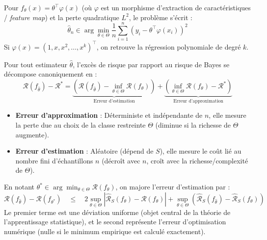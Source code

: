 \begin{example}
    Pour $f_\theta(x) = \theta^\top \varphi(x)$ (où $\varphi$ est un morphisme d'extraction de caractéristiques / \emph{feature map}) et la perte quadratique $L^2$, le problème s'écrit :
    \begin{equation}
        \hat{\theta}_n \in \arg \min_{\theta \in \Theta} \frac{1}{n} \sum_{i=1}^n (y_i - \theta^\top \varphi(x_i))^2
    \end{equation}
    Si $\varphi(x) = (1, x, x^2, \dots, x^k)^\top$, on retrouve la régression polynomiale de degré $k$.
\end{example}

\begin{proposition}
    Pour tout estimateur $\hat{\theta}$, l'excès de risque par rapport au risque de Bayes se décompose canoniquement en :
    \begin{equation}
        \boxed{\mathcal{R}(f_{\hat{\theta}}) - \mathcal{R}^* = \underbrace{\left(\mathcal{R}(f_{\hat{\theta}}) - \inf_{\theta \in \Theta} \mathcal{R}(f_\theta)\right)}_{\text{Erreur d'estimation}} + \underbrace{\left(\inf_{\theta \in \Theta} \mathcal{R}(f_\theta) - \mathcal{R}^*\right)}_{\text{Erreur d'approximation}}}
    \end{equation}
    \begin{itemize}
        \item \textbf{Erreur d'approximation} : Déterministe et indépendante de $n$, elle mesure la perte due au choix de la classe restreinte $\Theta$ (diminue si la richesse de $\Theta$ augmente).
        \item \textbf{Erreur d'estimation} : Aléatoire (dépend de $S$), elle mesure le coût lié au nombre fini d'échantillons $n$ (décroît avec $n$, croît avec la richesse/complexité de $\Theta$).
    \end{itemize}
\end{proposition}

\begin{remark}
    En notant $\theta^* \in \arg \min_{\theta \in \Theta} \mathcal{R}(f_\theta)$, on majore l'erreur d'estimation par :
    \begin{equation}
        \mathcal{R}(f_{\hat{\theta}}) - \mathcal{R}(f_{\theta^*}) 
        \quad \leqslant \quad 2 \sup_{\theta \in \Theta} |\hat{\mathcal{R}}_S(f_\theta) - \mathcal{R}(f_\theta)| + \sup_{\theta \in \Theta} (\hat{\mathcal{R}}_S(f_{\hat{\theta}}) - \hat{\mathcal{R}}_S(f_\theta))
    \end{equation}
    Le premier terme est une déviation uniforme (objet central de la théorie de l'apprentissage statistique), et le second représente l'erreur d'optimisation numérique (nulle si le minimum empirique est calculé exactement).
\end{remark}

